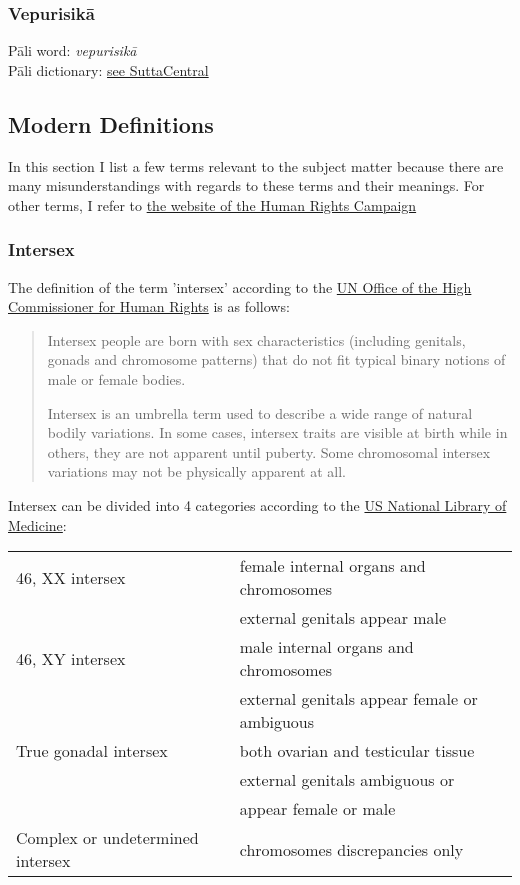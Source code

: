 \subsubsection{Vepurisikā}
Pāli word: {\em vepurisikā} \\
Pāli dictionary: \href{https://suttacentral.net/define/vepurisik%C4%81}{see SuttaCentral} \\

\subsection{Modern Definitions}
In this section I list a few terms relevant to the subject matter because there are many misunderstandings with regards to these terms and their meanings. For other terms, I refer to \href{https://www.hrc.org/resources/glossary-of-terms}{the website of the Human Rights Campaign}

\subsubsection{Intersex}
\label{intersex}
The definition of the term 'intersex' according to the \href{https://unfe.org/system/unfe-65-Intersex_Factsheet_ENGLISH.pdf}{UN Office of the High Commissioner for Human Rights} is as follows:

\begin{quote}
Intersex people are born with sex characteristics (including genitals, gonads and chromosome patterns) that do not fit typical binary notions of male or female bodies.

Intersex is an umbrella term used to describe a wide range of natural bodily variations. In some cases, intersex traits are visible at birth while in others, they are not apparent until puberty. Some chromosomal intersex variations may not be physically apparent at all.
\end{quote}

Intersex can be divided into 4 categories according to the \href{https://medlineplus.gov/ency/article/001669.htm}{US National Library of Medicine}:

\begin{tabular}{ l l }
46, XX intersex & female internal organs and chromosomes \\
& external genitals appear male \\
46, XY intersex & male internal organs and chromosomes \\
& external genitals appear female or ambiguous \\
True gonadal intersex & both ovarian and testicular tissue \\
& external genitals ambiguous or \\
& appear female or male \\
Complex or undetermined intersex & chromosomes discrepancies only \\
\end{tabular}


